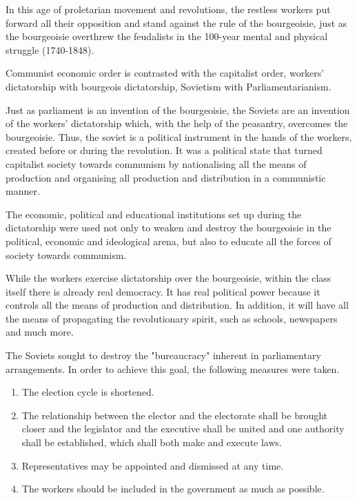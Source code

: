 In this age of proletarian movement and revolutions, the restless workers put forward all their opposition and 
stand against the rule of the bourgeoisie, just as the bourgeoisie overthrew the feudalists in the 100-year mental and 
physical struggle (1740-1848).\nline

Communist economic order is contrasted with the capitalist order, workers' dictatorship with bourgeois dictatorship, 
Sovietism with Parliamentarianism.\nline

Just as parliament is an invention of the bourgeoisie, the Soviets are an invention of the workers' dictatorship which, 
with the help of the peasantry, overcomes the bourgeoisie. Thus, the soviet is a political instrument in the hands of 
the workers, created before or during the revolution. It was a political state that turned capitalist society towards 
communism by nationalising all the means of production and organising all production and distribution in a communistic manner.\nline

The economic, political and educational institutions set up during the dictatorship were used not only to weaken and destroy 
the bourgeoisie in the political, economic and ideological arena, but also to educate all the forces of society towards communism.\nline

While the workers exercise dictatorship over the bourgeoisie, within the class itself there is already real democracy. 
It has real political power because it controls all the means of production and distribution. In addition, it will have all 
the means of propagating the revolutionary spirit, such as schools, newspapers and much more.\nline

The Soviets sought to destroy the "bureaucracy" inherent in parliamentary arrangements. 
In order to achieve this goal, the following measures were taken.\nline

\begin{enumerate}
    \item The election cycle is shortened.
    \item The relationship between the elector and the electorate shall be brought closer and the legislator and the executive shall be united and one authority shall be established, which shall both make and execute laws.
    \item Representatives may be appointed and dismissed at any time.
    \item The workers should be included in the government as much as possible.
\end{enumerate}

